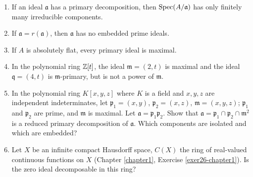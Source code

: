 
\begin{enumerate}
    \item \label{exer1-chapter4}If an ideal $\mathfrak{a}$ has a primary decomposition, then $\operatorname{Spec}(A/\mathfrak{a})$ has only finitely many irreducible components.

    \item \label{exer2-chapter4}If $\mathfrak{a} = r(\mathfrak{a})$, then $\mathfrak{a}$ has no embedded prime ideals.

    \item \label{exer3-chapter4}If $A$ is absolutely flat, every primary ideal is maximal.

    \item \label{exer4-chapter4}In the polynomial ring $\mathbb{Z}[t]$, the ideal $\mathfrak{m} = (2, t)$ is maximal and the ideal $\mathfrak{q} = (4, t)$ is $\mathfrak{m}$-primary, but is not a power of $\mathfrak{m}$.

    \item \label{exer5-chapter4}In the polynomial ring $K[x, y, z]$ where $K$ is a field and $x, y, z$ are independent indeterminates, let $\mathfrak{p}_1 = (x, y)$, $\mathfrak{p}_2 = (x, z)$, $\mathfrak{m} = (x, y, z)$; $\mathfrak{p}_1$ and $\mathfrak{p}_2$ are prime, and $\mathfrak{m}$ is maximal. Let $\mathfrak{a} = \mathfrak{p}_1 \mathfrak{p}_2$. Show that $\mathfrak{a} = \mathfrak{p}_1 \cap \mathfrak{p}_2 \cap \mathfrak{m}^2$ is a reduced primary decomposition of $\mathfrak{a}$. Which components are isolated and which are embedded?

    \item \label{exer6-chapter4}Let $X$ be an infinite compact Hausdorff space, $C(X)$ the ring of real-valued continuous functions on $X$ (Chapter \ref{chapter1}, Exercise \ref{exer26-chapter1}). Is the zero ideal decomposable in this ring?


\end{enumerate}
